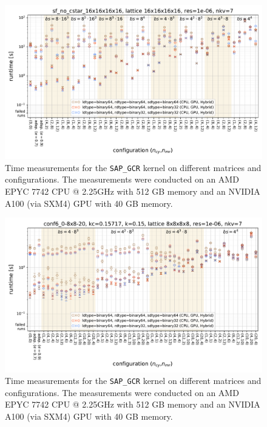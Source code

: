 \documentclass{article}
\theoremstyle{plain} %
\theoremstyle{convention} %
\theoremstyle{remark} %
\def\code#1{\texttt{#1}}
\numberwithin{equation}{section}
\begin{document}
\begin{figure}[h]
    \centering
    \includegraphics[width=1.0\textwidth]{plots/sap_gcr_sf_no_cstar_16x16x16x16_lattice_16x16x16x16_res=1e-06_nkv=7}
    \caption{Time measurements for the \code{SAP\_GCR} kernel on different matrices and configurations. The measurements were conducted on an AMD EPYC 7742 CPU @ 2.25GHz with 512 GB memory and an NVIDIA A100 (via SXM4) GPU with 40 GB memory.}
    \label{fig:sap_gcr3}
    \label{fig:sap_gcr_sf_16x16x16x16}
\end{figure}

\begin{figure}[h]
    \centering
    \includegraphics[width=1.0\textwidth]{plots/sap_gcr_conf6_0-8x8-20_kc=0.15717_k=0.15_lattice_8x8x8x8_res=1e-06_nkv=7}
    \caption{Time measurements for the \code{SAP\_GCR} kernel on different matrices and configurations. The measurements were conducted on an AMD EPYC 7742 CPU @ 2.25GHz with 512 GB memory and an NVIDIA A100 (via SXM4) GPU with 40 GB memory.}
    \label{fig:sap_gcr2}
    \label{fig:sap_gcr_conf6_0-8x8-20_0.15}
\end{figure}
\end{document}
